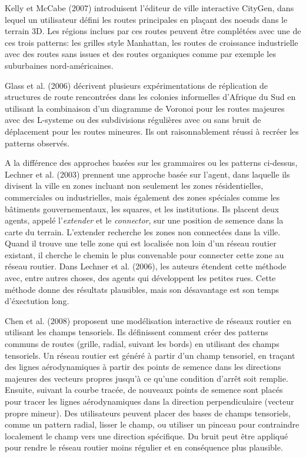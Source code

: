 \documentclass[11pt]{article}
\begin{document}
Kelly et McCabe (2007) introduisent l'éditeur de ville interactive CityGen, dans lequel un utilisateur défini les routes principales en plaçant des noeuds dans le terrain 3D. Les régions inclues par ces routes peuvent être complétées avec une de ces trois patterns: les grilles style Manhattan, les routes de croissance industrielle avec des routes sans issues et des routes organiques comme par exemple les suburbaines nord-américaines. \newline

Glass et al. (2006) décrivent plusieurs expérimentations de réplication de structures de route rencontrées dans les colonies informelles d'Afrique du Sud en utilisant la combinaison d'un diagramme de Voronoi pour les routes majeures avec des L-systeme ou des subdivisions régulières avec ou sans bruit de déplacement pour les routes mineures. Ils ont raisonnablement réussi à recréer les patterns observés. \newline

A la différence des approches basées sur les grammaires ou les patterns ci-dessus, Lechner et al. (2003) prennent une approche basée sur l'agent, dans laquelle ils divisent la ville en zones incluant non seulement les zones résidentielles, commerciales ou industrielles, mais également des zones spéciales comme les bâtiments gouvernementaux, les squares, et les institutions. Ils placent deux agents, appelé l'\textit{extender} et le \textit{connector}, sur une position de semence dans la carte du terrain. L'extender recherche les zones non connectées dans la ville. Quand il trouve une telle zone qui est localisée non loin d'un réseau routier existant, il cherche le chemin le plus convenable pour connecter cette zone au réseau routier. Dans Lechner et al. (2006), les auteurs étendent cette méthode avec, entre autres choses, des agents qui développent les petites rues. Cette méthode donne des résultats plausibles, mais son désavantage est son temps d'éxectution long. \newline

Chen et al. (2008) proposent une modélisation interactive de réseaux routier en utilisant les champs tensoriels. Ils définissent comment créer des patterns communs de routes (grille, radial, suivant les bords) en utilisant des champs tensoriels. Un réseau routier est généré à partir d'un champ tensoriel, en traçant des lignes aérodynamiques à partir des points de semence dans les directions majeures des vecteurs propres jusqu'à ce qu'une condition d'arrêt soit remplie. Ensuite, suivant la courbe tracée, de nouveaux points de semence sont placés pour tracer les lignes aérodynamiques dans la direction perpendiculaire (vecteur propre mineur). Des utilisateurs peuvent placer des bases de champs tensoriels, comme un pattern radial, lisser le champ, ou utiliser un pinceau pour contraindre localement le champ vers une direction spécifique. Du bruit peut être appliqué pour rendre le réseau routier moins régulier et en conséquence plus plausible. \newline
\end{document}
